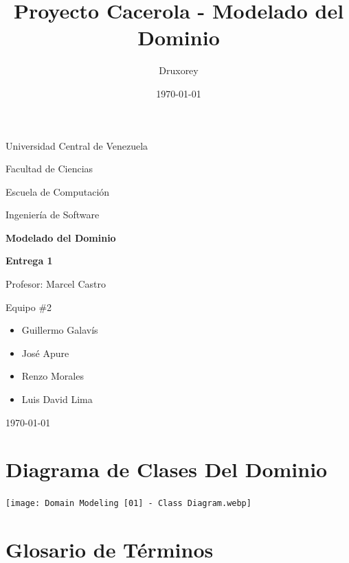\documentclass[12pt]{article}
\title{Proyecto Cacerola - Modelado del Dominio} %
\author{Druxorey} %
\date{\today} %
\begin{document}
\begin{titlepage}
	\centering
	\vspace{1cm}
	{\large {Universidad Central de Venezuela}\par}
	{\large {Facultad de Ciencias}\par}
	{\large {Escuela de Computación}\par}
	{\large {Ingeniería de Software}\par}
	\vspace{6cm}
	{\LARGE \textbf{Modelado del Dominio}\par}
	\vspace{0.25cm}
	{\Large \textbf{Entrega 1}\par}
	\vfill
	\begin{flushleft}
		{\large Profesor: Marcel Castro\par\vspace{-0.5em}}
		{\large Equipo \#2\par\vspace{-1em}}
		\begin{itemize}
			\item Guillermo Galavís\vspace{-0.5em}
			\item José Apure\vspace{-0.5em}
			\item Renzo Morales\vspace{-0.5em}
			\item Luis David Lima\vspace{-0.5em}
		\end{itemize}
	\end{flushleft}
	\vspace{0.5cm}
	\centering
	{\large \today\par}
\end{titlepage}

\section{Diagrama de Clases Del Dominio}

\vspace{1cm}

\begin{center}
	\texttt{[image: Domain Modeling [01] - Class Diagram.webp]}
\end{center}

\pagebreak

\section{Glosario de Términos}
\end{document}

